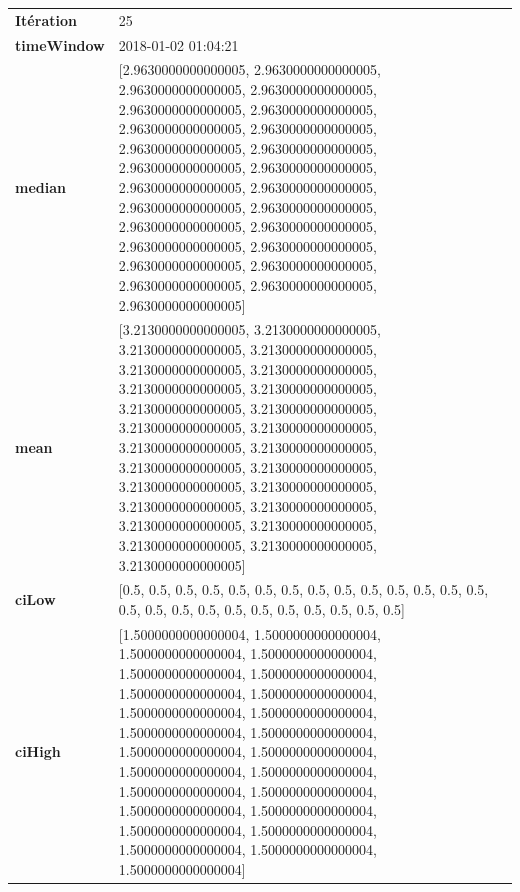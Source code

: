 \begin{table}[H]
	\centering
	\begin{tabularx}{\textwidth}{lX}
		\textbf{Itération}& 25 \\
		\textbf{timeWindow}& 2018-01-02 01:04:21 \\
		\textbf{median}& [2.9630000000000005, 2.9630000000000005, 2.9630000000000005, 2.9630000000000005, 2.9630000000000005, 2.9630000000000005, 2.9630000000000005, 2.9630000000000005, 2.9630000000000005, 2.9630000000000005, 2.9630000000000005, 2.9630000000000005, 2.9630000000000005, 2.9630000000000005, 2.9630000000000005, 2.9630000000000005, 2.9630000000000005, 2.9630000000000005, 2.9630000000000005, 2.9630000000000005, 2.9630000000000005, 2.9630000000000005, 2.9630000000000005, 2.9630000000000005, 2.9630000000000005] \\
		\textbf{mean} & [3.2130000000000005, 3.2130000000000005, 3.2130000000000005, 3.2130000000000005, 3.2130000000000005, 3.2130000000000005, 3.2130000000000005, 3.2130000000000005, 3.2130000000000005, 3.2130000000000005, 3.2130000000000005, 3.2130000000000005, 3.2130000000000005, 3.2130000000000005, 3.2130000000000005, 3.2130000000000005, 3.2130000000000005, 3.2130000000000005, 3.2130000000000005, 3.2130000000000005, 3.2130000000000005, 3.2130000000000005, 3.2130000000000005, 3.2130000000000005, 3.2130000000000005] \\
		\textbf{ciLow}& [0.5, 0.5, 0.5, 0.5, 0.5, 0.5, 0.5, 0.5, 0.5, 0.5, 0.5, 0.5, 0.5, 0.5, 0.5, 0.5, 0.5, 0.5, 0.5, 0.5, 0.5, 0.5, 0.5, 0.5, 0.5] \\
		\textbf{ciHigh}& [1.5000000000000004, 1.5000000000000004, 1.5000000000000004, 1.5000000000000004, 1.5000000000000004, 1.5000000000000004, 1.5000000000000004, 1.5000000000000004, 1.5000000000000004, 1.5000000000000004, 1.5000000000000004, 1.5000000000000004, 1.5000000000000004, 1.5000000000000004, 1.5000000000000004, 1.5000000000000004, 1.5000000000000004, 1.5000000000000004, 1.5000000000000004, 1.5000000000000004, 1.5000000000000004, 1.5000000000000004, 1.5000000000000004, 1.5000000000000004, 1.5000000000000004] \\
							\end{tabularx} 
						\end{table}
						
